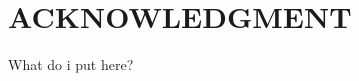 \documentclass[letterpaper, 10 pt, conference]{ieeeconf}  %
\begin{document}








\section*{ACKNOWLEDGMENT}
What do i put here?






\end{document}

